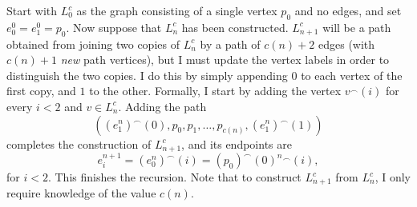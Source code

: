 \documentclass[11pt]{article}
\theoremstyle{plain}
\theoremstyle{definition}
\theoremstyle{remark}
\begin{document}
Start with $L^c_0$ as the graph consisting of a single vertex $p_0$ and no edges, and set $e^0_0=e^0_1=p_0$.
Now suppose that $L^c_n$ has been constructed.
$L^c_{n+1}$ will be a path obtained from joining two copies of $L^c_n$ by a path of $c(n)+2$ edges (with $c(n)+1$ \emph{new} path vertices), but I must update the vertex labels in order to distinguish the two copies.
I do this by simply appending $0$ to each vertex of the first copy, and $1$ to the other.
Formally, I start by adding the vertex $v^\frown(i)$ for every $i<2$ and $v\in L^c_n$.
Adding the path $$((e_1^n)^\smallfrown(0),p_0,p_1,\dots,p_{c(n)},(e_1^n)^\smallfrown(1))$$ completes the construction of $L^c_{n+1}$, and its endpoints are $$e_i^{n+1}=(e_0^n)^\smallfrown(i)=(p_0)^\smallfrown(0)^n{}^\smallfrown(i),$$ for $i<2$.
This finishes the recursion.
Note that to construct $L^c_{n+1}$ from $L^c_n$, I only require knowledge of the value $c(n)$.
\end{document}
